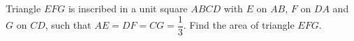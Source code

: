 Triangle $EFG$ is inscribed in a unit square $ABCD$ with $E$ on $AB$, $F$ on $DA$ and $G$ on $CD$, such that $AE=DF=CG=\dfrac{1}{3}$. Find the area of triangle $EFG$.
